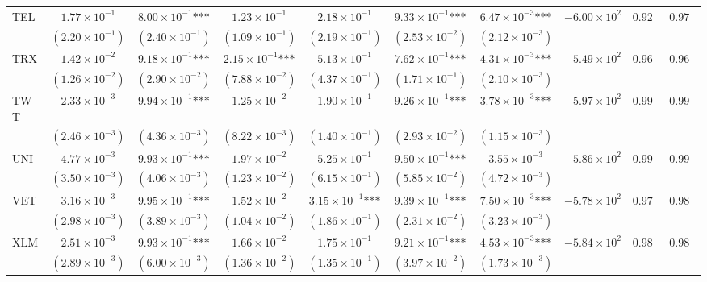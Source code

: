 \documentclass{article}
\begin{document}
\begin{landscape}
\begin{longtable}{lccccccccc}
TEL & $1.77\times 10^{-1}$ & $8.00\times 10^{-1}\text{***}$ & $1.23\times 10^{-1}$ & $2.18\times 10^{-1}$ & $9.33\times 10^{-1}\text{***}$ & $6.47\times 10^{-3}\text{***}$ & $-6.00\times 10^{2}$ & $0.924$ & $0.972$ \\
 & $(2.20\times 10^{-1})$ & $(2.40\times 10^{-1})$ & $(1.09\times 10^{-1})$ & $(2.19\times 10^{-1})$ & $(2.53\times 10^{-2})$ & $(2.12\times 10^{-3})$ &  &  &  \\
TRX & $1.42\times 10^{-2}$ & $9.18\times 10^{-1}\text{***}$ & $2.15\times 10^{-1}\text{***}$ & $5.13\times 10^{-1}$ & $7.62\times 10^{-1}\text{***}$ & $4.31\times 10^{-3}\text{***}$ & $-5.49\times 10^{2}$ & $0.964$ & $0.960$ \\
 & $(1.26\times 10^{-2})$ & $(2.90\times 10^{-2})$ & $(7.88\times 10^{-2})$ & $(4.37\times 10^{-1})$ & $(1.71\times 10^{-1})$ & $(2.10\times 10^{-3})$ &  &  &  \\
TWT & $2.33\times 10^{-3}$ & $9.94\times 10^{-1}\text{***}$ & $1.25\times 10^{-2}$ & $1.90\times 10^{-1}$ & $9.26\times 10^{-1}\text{***}$ & $3.78\times 10^{-3}\text{***}$ & $-5.97\times 10^{2}$ & $0.990$ & $0.990$ \\
 & $(2.46\times 10^{-3})$ & $(4.36\times 10^{-3})$ & $(8.22\times 10^{-3})$ & $(1.40\times 10^{-1})$ & $(2.93\times 10^{-2})$ & $(1.15\times 10^{-3})$ &  &  &  \\
UNI & $4.77\times 10^{-3}$ & $9.93\times 10^{-1}\text{***}$ & $1.97\times 10^{-2}$ & $5.25\times 10^{-1}$ & $9.50\times 10^{-1}\text{***}$ & $3.55\times 10^{-3}$ & $-5.86\times 10^{2}$ & $0.994$ & $0.994$ \\
 & $(3.50\times 10^{-3})$ & $(4.06\times 10^{-3})$ & $(1.23\times 10^{-2})$ & $(6.15\times 10^{-1})$ & $(5.85\times 10^{-2})$ & $(4.72\times 10^{-3})$ &  &  &  \\
VET & $3.16\times 10^{-3}$ & $9.95\times 10^{-1}\text{***}$ & $1.52\times 10^{-2}$ & $3.15\times 10^{-1}\text{***}$ & $9.39\times 10^{-1}\text{***}$ & $7.50\times 10^{-3}\text{***}$ & $-5.78\times 10^{2}$ & $0.973$ & $0.983$ \\
 & $(2.98\times 10^{-3})$ & $(3.89\times 10^{-3})$ & $(1.04\times 10^{-2})$ & $(1.86\times 10^{-1})$ & $(2.31\times 10^{-2})$ & $(3.23\times 10^{-3})$ &  &  &  \\
XLM & $2.51\times 10^{-3}$ & $9.93\times 10^{-1}\text{***}$ & $1.66\times 10^{-2}$ & $1.75\times 10^{-1}$ & $9.21\times 10^{-1}\text{***}$ & $4.53\times 10^{-3}\text{***}$ & $-5.84\times 10^{2}$ & $0.985$ & $0.982$ \\
 & $(2.89\times 10^{-3})$ & $(6.00\times 10^{-3})$ & $(1.36\times 10^{-2})$ & $(1.35\times 10^{-1})$ & $(3.97\times 10^{-2})$ & $(1.73\times 10^{-3})$ &  &  &  \\

\end{longtable}
\end{landscape}
\end{document}
